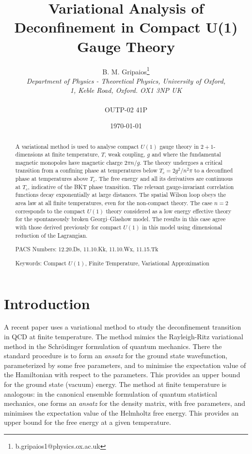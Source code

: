 \documentclass[a4paper,a4paper]{article}
\title{Variational Analysis of Deconfinement in Compact U(1) Gauge Theory}
\author{B. M. Gripaios\thanks{b.gripaios1@physics.ox.ac.uk}
\\\emph{Department of Physics - Theoretical Physics, University of Oxford,} 
\\ \emph{1, Keble Road, Oxford. OX1 3NP  UK
}
\\
\\ OUTP-02 41P 
}
\date{\today}
\begin{document}

\maketitle
\begin{abstract}
A variational method is used to analyse compact $U(1)$ gauge theory in $2+1$-dimensions 
at finite temperature, $T$, weak coupling, $g$ and where the fundamental magnetic monopoles have magnetic charge $2\pi n/g$.
The theory undergoes a critical transition from a confining phase at temperatures below $T_c=2g^2/n^2\pi$ to a 
deconfined phase at temperatures above $T_c$. The free energy and all its derivatives are continuous at $T_c$, indicative of the BKT
phase transition. 
The relevant gauge-invariant correlation functions decay exponentially at large distances. 
The spatial Wilson loop obeys the area law at all finite temperatures, even for the non-compact theory.
The case $n=2$ corresponds to the compact $U(1)$ theory considered as a low energy effective theory
for the spontaneously broken Georgi--Glashow model. 
The results in this case agree with those derived previously for compact $U(1)$ in this model
using dimensional reduction of the Lagrangian.

PACS Numbers: 12.20.Ds, 11.10.Kk, 11.10.Wx, 11.15.Tk

Keywords: Compact $U(1)$, Finite Temperature, Variational Approximation
\end{abstract}

\section{Introduction}
A recent paper \cite{Kogan:2002yr} uses a variational method to study the deconfinement transition in QCD 
at finite temperature. The method mimics the Rayleigh-Ritz variational method in the Schr\"{o}dinger formulation of
quantum mechanics. There the standard procedure is to form an \emph{ansatz} for the ground state wavefunction, 
parameterized by some
free parameters, and to minimise the expectation value of the Hamiltonian with respect to the parameters. 
This provides an upper bound for the ground state (vacuum) energy. The method at finite temperature is analogous: 
in the canonical ensemble formulation of quantum statistical mechanics, one forms an \emph{ansatz} for the density matrix,
with free parameters, and minimises the expectation value of the Helmholtz free energy. This provides an upper bound
for the free energy at a given temperature.
\end{document}
